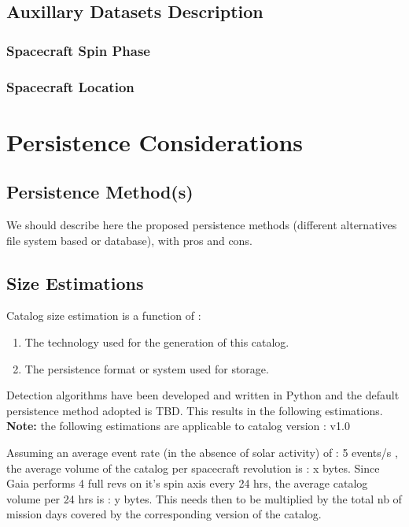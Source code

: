 \documentclass[a4paper, 11pt]{article}
\newcommand{\dmVersion}{v1.0}
\begin{document}
\subsection{Auxillary Datasets Description}
\label{sec:AuxModel}
\subsubsection{Spacecraft Spin Phase}
\subsubsection{Spacecraft Location}

\section{Persistence Considerations}
\label{sec:persist}
\subsection{Persistence Method(s)}

We should describe here the proposed persistence methods (different alternatives file system based or database), with pros and cons.

\subsection{Size Estimations}

Catalog size estimation is a function of :
\begin{enumerate}
\item The technology used for the generation of this catalog. 
\item The persistence format or system used for storage.
\end{enumerate}

Detection algorithms have been developed and written in Python and the default persistence method adopted is TBD. This results in the following estimations.
\newline
\newline
\textbf{Note:} the following estimations are applicable to catalog version : \dmVersion  
\newline
\newline

Assuming an average event rate (in the absence of solar activity) of : 5 events/s , the average volume of the catalog per spacecraft revolution is : x bytes. Since Gaia performs 4 full revs on it's spin axis every 24 hrs, the average catalog volume per 24 hrs is : y bytes. This needs then to be multiplied by the total nb of mission days covered by the corresponding version of the catalog. 
\end{document}
